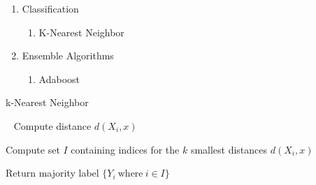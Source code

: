\documentclass[a4paper]{article}
\begin{document}
\begin{enumerate}
\item Classification
	\begin{enumerate}
		\item  K-Nearest Neighbor 
	\end{enumerate}

\item Ensemble Algorithms
	\begin{enumerate}
		\item Adaboost 
	\end{enumerate} 
\end{enumerate}


  \begin{algorithm}
 
   \caption{k-Nearest Neighbor  ~ \cite{knearest91} }
    \begin{algorithmic}[1]
      \
            \State Compute distance $d{(X_i,x)}$
        \EndFor
        
         \State Compute set $I$ containing indices for the $k$ smallest distances $d{(X_i,x)}$
     
       \State Return majority label $\{Y_i \ \text{where}\ i \in I \}$



 \EndFunction

\end{algorithmic}
\end{algorithm}
\end{document}
